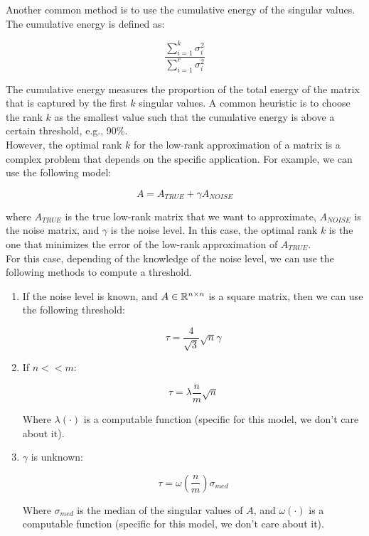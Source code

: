 Another common method is to use the cumulative energy of the singular values. The cumulative energy is defined as:

\begin{equation}
    \frac{\sum_{i=1}^{k} \sigma_i^2}{\sum_{i=1}^{r} \sigma_i^2}
\end{equation}

The cumulative energy measures the proportion of the total energy of the matrix that is captured by the first $k$ singular values. A common
heuristic is to choose the rank $k$ as the smallest value such that the cumulative energy is above a certain threshold, e.g., 90\%.\\

However, the optimal rank $k$ for the low-rank approximation of a matrix is a complex problem that depends on the specific application.
For example, we can use the following model:

\begin{equation}
    A = A_{TRUE} + \gamma A_{NOISE}
\end{equation}

where $A_{TRUE}$ is the true low-rank matrix that we want to approximate, $A_{NOISE}$ is the noise matrix, and $\gamma$ is the noise level.
In this case, the optimal rank $k$ is the one that minimizes the error of the low-rank approximation of $A_{TRUE}$.\\

For this case, depending of the knowledge of the noise level, we can use the following methods to compute a threshold.

\begin{enumerate}
    \item If the noise level is known, and $A \in \mathbb{R}^{n \times n}$ is a square matrix, then we can use the following threshold:
    
    \begin{equation}
        \tau = \frac{4}{\sqrt{3}} \sqrt{n} \gamma
    \end{equation}

    \item If $n << m$:
    
    \begin{equation}
        \tau = \lambda{\frac{n}{m}} \sqrt{n}
    \end{equation}

    Where $\lambda(\cdot)$ is a computable function (specific for this model, we don't care about it).

    \item $\gamma$ is unknown:
    
    \begin{equation}
        \tau = \omega(\frac{n}{m}) \sigma_{med}
    \end{equation}

    Where $\sigma_{med}$ is the median of the singular values of $A$, and $\omega(\cdot)$ is a computable function 
    (specific for this model, we don't care about it).
\end{enumerate}

